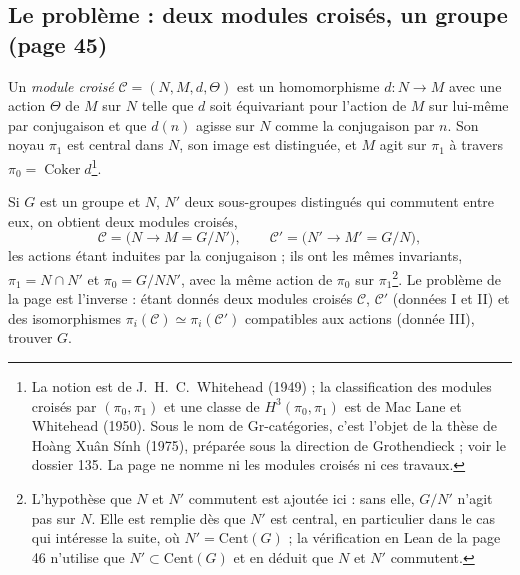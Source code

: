 \documentclass[11pt,a4paper]{article}
\begin{document}
\subsection*{Le problème : deux modules croisés, un groupe (page 45)}

Un \emph{module croisé} $\mathcal{C} = (N, M, d, \Theta)$ est un
homomorphisme $d \colon N \to M$ avec une action $\Theta$ de $M$ sur $N$ telle
que $d$ soit équivariant pour l'action de $M$ sur lui-même par conjugaison
et que $d(n)$ agisse sur $N$ comme la conjugaison par $n$. Son noyau
$\pi_1$ est central dans $N$, son image est distinguée, et $M$ agit sur
$\pi_1$ à travers $\pi_0 = \operatorname{Coker} d$\footnote{La notion est de
J.~H.~C.~Whitehead (1949) ; la classification des modules croisés par
$(\pi_0, \pi_1)$ et une classe de $H^{3}(\pi_0, \pi_1)$ est de Mac Lane et
Whitehead (1950). Sous le nom de Gr-catégories, c'est l'objet de la thèse
de Hoàng Xuân Sính (1975), préparée sous la direction de Grothendieck ;
voir le dossier 135. La page ne nomme ni les modules croisés ni ces
travaux.}.

Si $G$ est un groupe et $N$, $N'$ deux sous-groupes distingués qui commutent
entre eux, on obtient deux modules croisés,
\[
\mathcal{C} = \bigl(N \to M = G/N'\bigr), \qquad
\mathcal{C}' = \bigl(N' \to M' = G/N\bigr),
\]
les actions étant induites par la conjugaison ; ils ont les mêmes
invariants, $\pi_1 = N \cap N'$ et $\pi_0 = G/NN'$, avec la même action de
$\pi_0$ sur $\pi_1$\footnote{L'hypothèse que $N$ et $N'$ commutent est
ajoutée ici : sans elle, $G/N'$ n'agit pas sur $N$. Elle est remplie dès que
$N'$ est central, en particulier dans le cas qui intéresse la suite, où
$N' = \mathrm{Cent}(G)$ ; la vérification en Lean de la page 46 n'utilise que
$N' \subset \mathrm{Cent}(G)$ et en déduit que $N$ et $N'$ commutent.}. Le problème de la
page est l'inverse : étant donnés deux modules croisés $\mathcal{C}$,
$\mathcal{C}'$ (données I et II) et des isomorphismes
$\pi_i(\mathcal{C}) \simeq \pi_i(\mathcal{C}')$ compatibles aux actions
(donnée III), trouver $G$.
\end{document}

